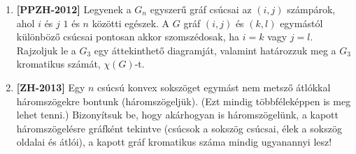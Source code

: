 \documentclass[a4paper, 12pt]{article}
\begin{document}
\begin{enumerate}
            \item \textbf{[PPZH-2012]} Legyenek a $G_n$ egyszerű gráf csúcsai az $(i,j)$ számpárok, ahol $i$ és $j$ $1$ és $n$ közötti egészek. A $G$ gráf $(i,j)$ és $(k,l)$ egymástól különböző csúcsai pontosan akkor szomszédosak, ha $i=k$ vagy $j=l$. Rajzoljuk le a $G_3$ egy áttekinthető diagramját, valamint határozzuk meg a $G_3$ kromatikus számát, $\chi(G)$-t.
            \item \textbf{[ZH-2013]} Egy $n$ csúcsú konvex sokszöget egymást nem metsző átlókkal háromszögekre bontunk (háromszögeljük). (Ezt mindig többféleképpen is meg lehet tenni.) Bizonyítsuk be, hogy akárhogyan is háromszögelünk, a kapott háromszögelésre gráfként tekintve (csúcsok a sokszög csúcsai, élek a sokszög oldalai és átlói), a kapott gráf kromatikus száma mindig ugyanannyi lesz!
            


\end{enumerate}
\end{document}

